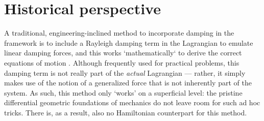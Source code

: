\section{Historical perspective}
A traditional, engineering-inclined method to incorporate damping in the framework is to include a Rayleigh damping term
in the Lagrangian to emulate linear damping forces, and this works `mathematically` to derive the correct equations of
motion \cite{Goldstein2011}. Although frequently used for practical problems, this damping term is not really part of
the \emph{actual} Lagrangian --- rather, it simply makes use of the notion of a generalized force that is not inherently
part of the system. As such, this method only `works' on a superficial level: the pristine differential geometric
foundations of mechanics do not leave room for such ad hoc tricks. There is, as a result, also no Hamiltonian
counterpart for this method. 

